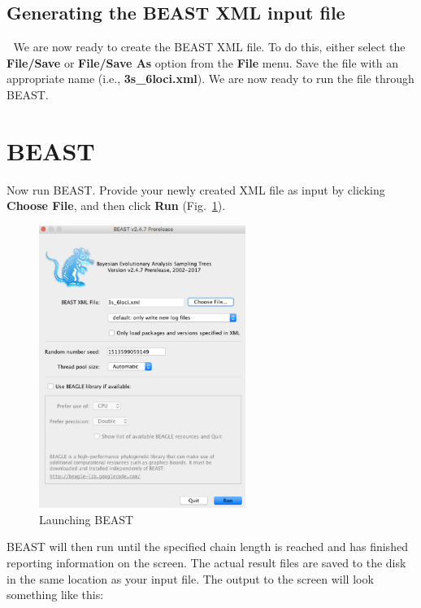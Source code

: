 \documentclass[11pt]{article}
\begin{document}
\subsection*{Generating the BEAST XML input file}
We are now ready to create the BEAST XML file. To do this, either select the \textbf{File/Save} or \textbf{File/Save As} option from the \textbf{File} menu. Save the file with an appropriate name (i.e., \textbf{3s\_6loci.xml}). We are now ready to run the file through BEAST.

\section*{BEAST}

Now run BEAST. Provide your newly created XML file as input by clicking \textbf{Choose File}, and then click \textbf{Run} (Fig.~\ref{fig_beast}).

\begin{figure}[h]
\center
\includegraphics[width=0.6\textwidth]{figs/fig9_beast}
\caption{Launching BEAST}
\label{fig_beast}
\end{figure}

BEAST will then run until the specified chain length is reached and has finished reporting information on the screen. The actual result files are saved to the disk in the same location as your input file. The output to the screen will look something like this: 
\end{document}

